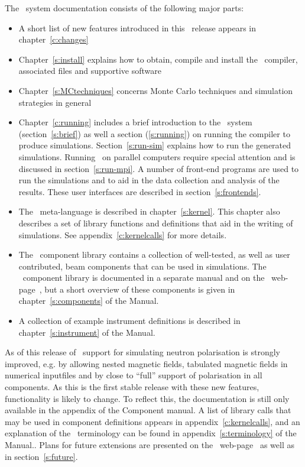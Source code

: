 The \MCS\ system documentation consists of the following major
parts:
\begin{itemize}
\item A short list of new features introduced in this \MCS\ release
  appears in chapter~\ref{c:changes}
\item Chapter~\ref{s:install} explains how to obtain, compile
  and install the \MCS\ compiler, associated files and supportive software
\item Chapter~\ref{s:MCtechniques} concerns Monte Carlo techniques
  and simulation strategies in general
\item Chapter~\ref{c:running} includes a brief introduction to the
  \MCS\ system
  (section~\ref{s:brief}) as well a section (\ref{s:running}) on running the compiler to produce
  simulations. Section~\ref{s:run-sim} explains how to run the generated
  simulations. Running \MCS\ on parallel computers require special
  attention and is discussed in section~\ref{s:run-mpi}. A number of front-end programs are used to run the
  simulations and to aid in the data collection and analysis of the
  results. These user interfaces are described in section~\ref{s:frontends}.
\item The \MCS\ meta-language is described in chapter~\ref{s:kernel}. This
  chapter also describes a set of library functions and definitions
  that aid in the writing of simulations. See
  appendix~\ref{c:kernelcalls} for more details.
\item The \MCS\ component library contains a collection of
  well-tested, as well as user contributed, beam components that can be used in simulations.
  The \MCS\ component library is documented in a separate manual
  and on the \MCS\ web-page~\cite{mcstas_webpage}, but a short overview of these
  components is given in chapter~\ref{s:components} of the Manual.
\item A collection of example instrument definitions is described in
  chapter~\ref{s:instrument} of the Manual.%

\end{itemize}

As of this release of \MCS\ support for simulating neutron
polarisation is strongly improved, e.g. by allowing nested magnetic
fields, tabulated magnetic fields in numerical inputfiles and by close
to ``full'' support of polarisation in all components. As this is the
first stable release with these new features, functionality is likely to change. To reflect this, the
documentation is still only available in the appendix of the Component manual. %
A list of library calls that may be used in component definitions
appears in appendix~\ref{c:kernelcalls}, and
an explanation of the \MCS\ terminology can be
found in appendix~\ref{s:terminology} of the Manual..
Plans for future extensions are presented on the \MCS\ web-page~\cite{mcstas_webpage} as well as in section~\ref{s:future}.


